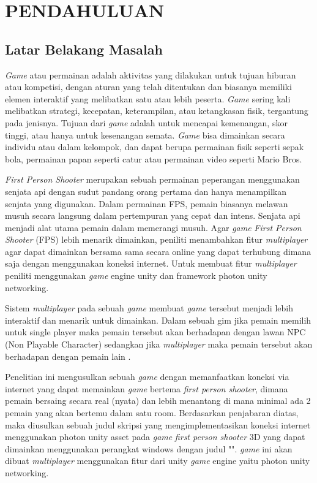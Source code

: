 \chapter{PENDAHULUAN}
\section{Latar Belakang Masalah}
\noindent

\textit{Game} atau permainan adalah aktivitas yang dilakukan untuk tujuan hiburan atau kompetisi, dengan aturan yang telah ditentukan dan biasanya memiliki elemen interaktif yang melibatkan satu atau lebih peserta. \textit{Game} sering kali melibatkan strategi, kecepatan, keterampilan, atau ketangkasan fisik, tergantung pada jenisnya. Tujuan dari \textit{game} adalah untuk mencapai kemenangan, skor tinggi, atau hanya untuk kesenangan semata. \textit{Game} bisa dimainkan secara individu atau dalam kelompok, dan dapat berupa permainan fisik seperti sepak bola, permainan papan seperti catur atau permainan video seperti Mario Bros\cite{fps}.

\textit{First Person Shooter} merupakan sebuah permainan peperangan menggunakan senjata api dengan sudut pandang orang pertama dan hanya menampilkan senjata yang digunakan.
Dalam permainan FPS, pemain biasanya melawan musuh secara langsung dalam pertempuran yang cepat dan intens\cite{fps}. Senjata api menjadi alat utama pemain dalam memerangi musuh.
Agar \textit{game} \textit{First Person Shooter} (FPS) lebih menarik dimainkan, peniliti menambahkan fitur \textit{multiplayer} agar dapat dimainkan bersama sama secara online yang dapat terhubung dimana saja dengan menggunakan koneksi internet. Untuk membuat fitur \textit{multiplayer} peniliti menggunakan \textit{game} engine unity dan framework photon unity networking.

Sistem \textit{multiplayer} pada sebuah \textit{\textit{game}} membuat \textit{\textit{game}} tersebut menjadi lebih interaktif dan menarik untuk dimainkan. Dalam sebuah gim jika pemain memilih untuk single player maka pemain tersebut akan berhadapan dengan lawan NPC (Non Playable Character) sedangkan jika \textit{multiplayer} maka pemain tersebut akan berhadapan dengan pemain lain \cite{Sarwodi}.


Penelitian ini mengusulkan sebuah \textit{\textit{game}} dengan memanfaatkan koneksi via internet yang dapat memainkan \textit{\textit{game}} bertema \textit{first person shooter}, dimana pemain bersaing secara real (nyata) dan lebih menantang di mana minimal ada 2 pemain yang akan bertemu dalam satu room.
Berdasarkan penjabaran diatas, maka diusulkan sebuah judul skripsi yang mengimplementasikan koneksi internet menggunakan photon unity asset pada \textit{\textit{game}} \textit{first person shooter} 3D yang dapat dimainkan menggunakan perangkat windows dengan judul "\judulId".
\textit{\textit{game}} ini akan dibuat \textit{multiplayer} menggunakan fitur dari unity \textit{\textit{game}} engine yaitu photon unity networking.

